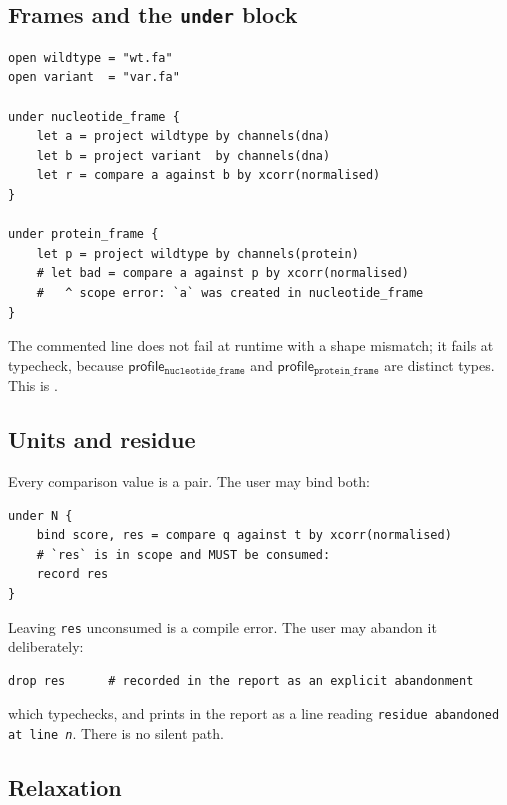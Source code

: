 \documentclass[11pt,twocolumn,a4paper]{article}
\theoremstyle{plain}
\theoremstyle{definition}
\theoremstyle{remark}
\newcommand{\typ}[1]{\ensuremath{\mathsf{#1}}}
\newcommand{\kw}[1]{\texttt{\textbf{#1}}}
\begin{document}
\subsection{Frames and the \kw{under} block}
\label{sec:frames}

\begin{lstlisting}[style=nonum]
open wildtype = "wt.fa"
open variant  = "var.fa"

under nucleotide_frame {
    let a = project wildtype by channels(dna)
    let b = project variant  by channels(dna)
    let r = compare a against b by xcorr(normalised)
}

under protein_frame {
    let p = project wildtype by channels(protein)
    # let bad = compare a against p by xcorr(normalised)
    #   ^ scope error: `a` was created in nucleotide_frame
}
\end{lstlisting}

The commented line does not fail at runtime with a shape mismatch; it
fails at typecheck, because \typ{profile}$_{\texttt{nucleotide\_frame}}$
and \typ{profile}$_{\texttt{protein\_frame}}$ are distinct types. This is
.

\subsection{Units and residue}
\label{sec:units}

Every comparison value is a pair. The user may bind both:

\begin{lstlisting}[style=nonum]
under N {
    bind score, res = compare q against t by xcorr(normalised)
    # `res` is in scope and MUST be consumed:
    record res
}
\end{lstlisting}

Leaving \texttt{res} unconsumed is a compile error. The user may
abandon it deliberately:

\begin{lstlisting}[style=nonum]
    drop res      # recorded in the report as an explicit abandonment
\end{lstlisting}

\noindent which typechecks, and prints in the report as a line reading
\texttt{residue abandoned at line \emph{n}}. There is no silent path.

\subsection{Relaxation}
\label{sec:relax}
\end{document}
